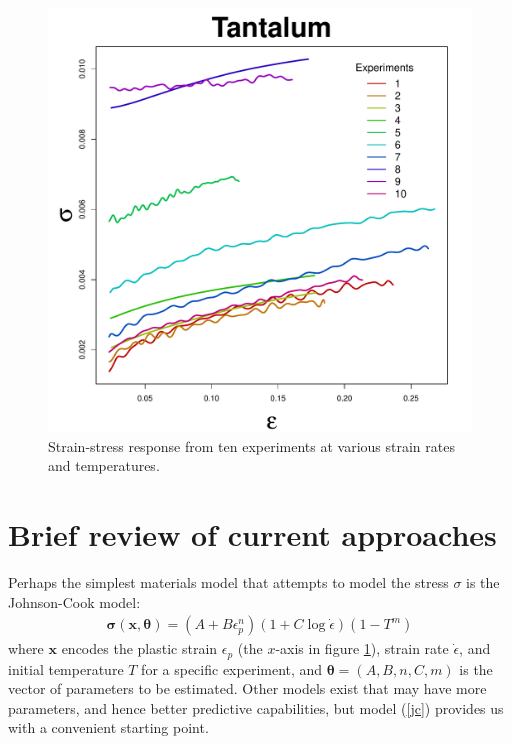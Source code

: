 \documentclass[12pt]{article}
\newcommand{\m}[1]{\mathbf{\bm{#1}}}
\begin{document}
\begin{figure}[H]
\begin{center}
\includegraphics[scale=0.40]{../figs/ta_all_data.pdf}
\caption{Strain-stress response from ten experiments at various strain rates and temperatures.}
\label{data}
\end{center}
\end{figure}

\section{Brief review of current approaches}

Perhaps the simplest materials model that attempts to model the stress $\sigma$ is the Johnson-Cook model:
\begin{align}
\m{\sigma}(\m{x}, \m{\theta}) = (A+B\epsilon_p^n)(1+C\log\dot\epsilon)(1-T^m)
\label{jc}
\end{align}
where $\m{x}$ encodes the plastic strain $\epsilon_p$ (the $x$-axis in figure \ref{data}), strain rate $\dot\epsilon$, and initial temperature $T$ for a specific experiment, and $\m{\theta}=(A,B,n,C,m)$ is the vector of parameters to be estimated. Other models exist that may have more parameters, and hence better predictive capabilities, but model (\ref{jc}) provides us with a convenient starting point.
\end{document}
